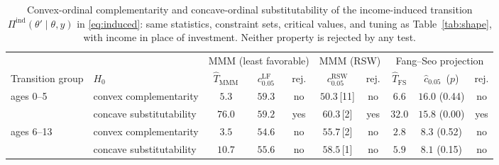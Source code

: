 \begin{table}[htbp]
\centering\small
\begin{tabular}{@{}llcccccccc@{}}
\toprule
 & & \multicolumn{3}{c}{MMM (least favorable)} & \multicolumn{2}{c}{MMM (RSW)} & \multicolumn{3}{c}{Fang--Seo projection} \\
\cmidrule(lr){3-5}\cmidrule(lr){6-7}\cmidrule(lr){8-10}
Transition group & $H_0$ & $\hat T_{\mathrm{MMM}}$ & $c^{\mathrm{LF}}_{0.05}$ & rej. & $c^{\mathrm{RSW}}_{0.05}$ & rej. & $\hat T_{\mathrm{FS}}$ & $\hat c_{0.05}$ \,($p$) & rej. \\ \midrule
ages 0--5 & convex complementarity & $5.3$ & $59.3$ & no & $50.3$\,[11] & no & $6.6$ & $16.0$ (0.44) & no \\
 & concave substitutability & $76.0$ & $59.2$ & yes & $60.3$\,[2] & yes & $32.0$ & $15.8$ (0.00) & yes \\
\midrule
ages 6--13 & convex complementarity & $3.5$ & $54.6$ & no & $55.7$\,[2] & no & $2.8$ & $8.3$ (0.52) & no \\
 & concave substitutability & $10.7$ & $55.6$ & no & $58.5$\,[1] & no & $5.9$ & $8.1$ (0.15) & no \\
\bottomrule
\end{tabular}
\caption{Convex-ordinal complementarity and concave-ordinal substitutability of the income-induced
transition $\Pi^{\mathrm{ind}}(\theta'\mid\theta,y)$ in \eqref{eq:induced}: same
statistics, constraint sets, critical values, and tuning as Table~\ref{tab:shape}, with
income in place of investment. Neither property is rejected by any test.}
\label{tab:shape_induced}
\end{table}

